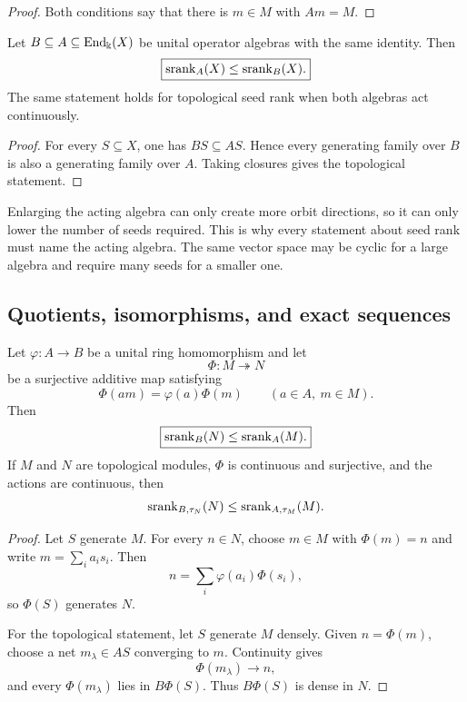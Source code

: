 \begin{proof}
Both conditions say that there is $m\in M$ with $Am=M$.
\end{proof}

\begin{proposition}
\label{prop:acting-algebra-monotonicity}
Let $B\subseteq A\subseteq\operatorname{End}_{\Bbbk}(X)$ be unital operator algebras with the same identity.  Then
\[
\boxed{\operatorname{srank}_A(X)\leq\operatorname{srank}_B(X).}
\]
The same statement holds for topological seed rank when both algebras act continuously.
\end{proposition}

\begin{proof}
For every $S\subseteq X$, one has $BS\subseteq AS$.  Hence every generating family over $B$ is also a generating family over $A$.  Taking closures gives the topological statement.
\end{proof}

\begin{interpretation}
Enlarging the acting algebra can only create more orbit directions, so it can only lower the number of seeds required.  This is why every statement about seed rank must name the acting algebra.  The same vector space may be cyclic for a large algebra and require many seeds for a smaller one.
\end{interpretation}


\subsection{Quotients, isomorphisms, and exact sequences}
\begin{theorem}
\label{thm:quotient-monotonicity}
Let $\varphi:A\to B$ be a unital ring homomorphism and let
\[
\Phi:M\twoheadrightarrow N
\]
be a surjective additive map satisfying
\[
\Phi(am)=\varphi(a)\Phi(m)
\qquad(a\in A,\ m\in M).
\]
Then
\[
\boxed{\operatorname{srank}_B(N)\leq\operatorname{srank}_A(M).}
\]
If $M$ and $N$ are topological modules, $\Phi$ is continuous and surjective, and the actions are continuous, then
\[
\operatorname{srank}_{B,\tau_N}(N)\leq\operatorname{srank}_{A,\tau_M}(M).
\]
\end{theorem}

\begin{proof}
Let $S$ generate $M$.  For every $n\in N$, choose $m\in M$ with $\Phi(m)=n$ and write $m=\sum_ia_is_i$.  Then
\[
n=\sum_i\varphi(a_i)\Phi(s_i),
\]
so $\Phi(S)$ generates $N$.

For the topological statement, let $S$ generate $M$ densely.  Given $n=\Phi(m)$, choose a net $m_\lambda\in AS$ converging to $m$.  Continuity gives
\[
\Phi(m_\lambda)\longrightarrow n,
\]
and every $\Phi(m_\lambda)$ lies in $B\Phi(S)$.  Thus $B\Phi(S)$ is dense in $N$.
\end{proof}

